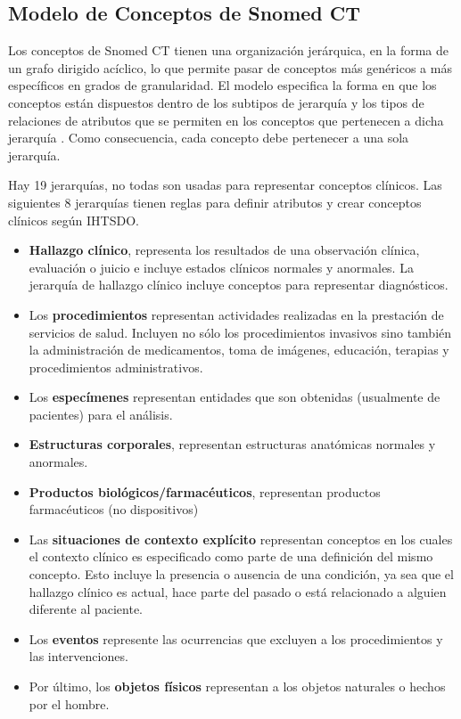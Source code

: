 \subsection{Modelo de Conceptos de Snomed CT}
Los conceptos de Snomed CT tienen una organización jerárquica, en la forma de un grafo dirigido acíclico, lo que permite pasar de conceptos más genéricos a más específicos en grados de granularidad\cite{Bhattacharyya2016}. El modelo especifica la forma en que los conceptos están dispuestos dentro de los subtipos de jerarquía y los tipos de relaciones de atributos que se permiten en los conceptos que pertenecen a dicha jerarquía \cite{Bhattacharyya2016,ihtsdo2016SG}. Como consecuencia, cada concepto debe pertenecer a una sola jerarquía.
% 
% 
 
Hay 19 jerarquías, no todas son usadas para representar conceptos clínicos. Las siguientes 8 jerarquías tienen reglas para definir atributos y crear conceptos clínicos según IHTSDO\cite{ihtsdo2016EG}.

\begin{itemize}
\item \textbf{Hallazgo clínico}, representa los resultados de una observación clínica, evaluación o juicio e incluye estados clínicos normales y anormales. La jerarquía de hallazgo clínico incluye conceptos para representar diagnósticos.
\item Los\textbf{ procedimientos} representan actividades realizadas en la prestación de servicios de salud. Incluyen no sólo los procedimientos invasivos sino también la administración de medicamentos, toma  de imágenes, educación, terapias y procedimientos administrativos.
\item Los \textbf{especímenes} representan entidades que son obtenidas (usualmente de pacientes) para el análisis.
\item \textbf{Estructuras corporales}, representan estructuras anatómicas normales y anormales.
\item \textbf{Productos biológicos/farmacéuticos}, representan productos farmacéuticos (no dispositivos)
\item Las \textbf{situaciones de contexto explícito} representan conceptos en los cuales el contexto clínico es especificado como parte de una definición del mismo concepto. Esto incluye la presencia o ausencia de una condición, ya sea que el hallazgo clínico es actual, hace parte del pasado o está relacionado a alguien diferente al paciente.
\item Los \textbf{eventos} represente las ocurrencias que excluyen a los procedimientos y las intervenciones.
\item Por último, los \textbf{objetos físicos }representan a los objetos naturales o hechos por el hombre.
\end{itemize}
 
